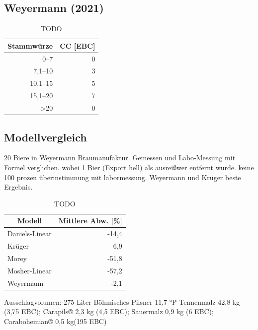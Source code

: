 \documentclass[a4paper,parskip=half]{scrartcl}
\begin{document}
\parencite[78]{Hanghofer2019}



\subsection*{Weyermann (2021)}

\parencite{KrausWeyermann2021b}

\begin{table}[H]
\centering
\begin{tabular}{rr}
\toprule
\multicolumn{1}{c}{\textbf{Stammwürze}} & \multicolumn{1}{c}{\textbf{CC [EBC]}} \\
\midrule
0–7 & 0 \\
7,1–10 & 3 \\
10,1–15 & 5 \\
15,1–20 & 7 \\
>20 & 0 \\
\bottomrule
\end{tabular}
\caption{TODO \parencite{KrausWeyermann2021b}}
\label{table:ccweyermann}
\end{table}

\subsection*{Modellvergleich}


\parencite{KrausWeyermann2021b}
20 Biere in Weyermann Braumanufaktur. Gemessen und Labo-Messung mit Formel verglichen.
wobei 1 Bier (Export hell) als ausreißwer entfernt wurde.
keine 100 prozen überinstimmung mit labormessung.
Weyermann und Krüger beste Ergebnis.

\begin{table}[H]
\centering
\begin{tabular}{lr}
\toprule
\multicolumn{1}{c}{\textbf{Modell}} & \multicolumn{1}{c}{\textbf{Mittlere Abw. [\%]}} \\
\midrule
Daniels-Linear & -14,4 \\
Krüger & 6,9 \\
Morey & -51,8 \\
Mosher-Linear & -57,2 \\
Weyermann & -2,1 \\
\bottomrule
\end{tabular}
\caption{TODO \parencite{KrausWeyermann2021b}}
\label{table:modelcompare}
\end{table}

Ausschlagvolumen: 275 Liter
Böhmisches Pilsner
11,7 °P
Tennenmalz
42,8 kg (3,75 EBC); Carapils® 2,3 kg
(4,5 EBC); Sauermalz 0,9 kg (6 EBC);
Carabohemian® 0,5 kg(195 EBC)
\end{document}
